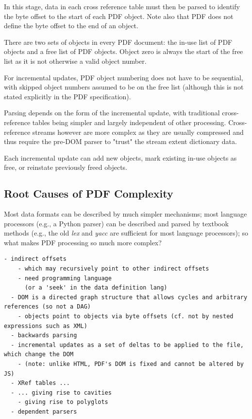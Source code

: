 In this stage, data in each cross reference table must then be parsed to
identify the byte offset to the start of each PDF object. Note also that PDF
does not define the byte offset to the end of an object.

There are two sets of
objects in every PDF document: the in-use list of PDF objects and a free list
of PDF objects. Object zero is always the start of the free list as it is not
otherwise a valid object number.

For incremental updates, PDF object numbering
does not have to be sequential, with skipped object numbers assumed to be on
the free list (although this is not stated explicitly in the PDF
specification).

Parsing depends on the form of the incremental update, with
traditional cross-reference tables being simpler and largely independent of
other processing. Cross-reference streams however are more complex as they are
usually compressed and thus require the pre-DOM parser to "trust" the stream
extent dictionary data.

Each incremental update can add new objects, mark existing in-use objects as
free, or reinstate previously freed objects.



\subsection{Root Causes of PDF Complexity}

Most data formats can be described by much simpler mechanisms;
most language processors (e.g., a Python parser) can be described and parsed by
textbook methods (e.g., the old \emph{lex} and \emph{yacc} are sufficient for
most language processors);
so what makes PDF processing so much more complex?
\begin{lstlisting}[style=meta]
  - indirect offsets
    - which may recursively point to other indirect offsets
    - need programming language
      (or a 'seek' in the data definition lang)
  - DOM is a directed graph structure that allows cycles and arbitrary references (so not a DAG)
    - objects point to objects via byte offsets (cf. not by nested expressions such as XML)  
  - backwards parsing
  - incremental updates as a set of deltas to be applied to the file, which change the DOM
    - (note: unlike HTML, PDF's DOM is fixed and cannot be altered by JS)
  - XRef tables ...
  - ... giving rise to cavities
    - giving rise to polyglots
  - dependent parsers
\end{lstlisting}

